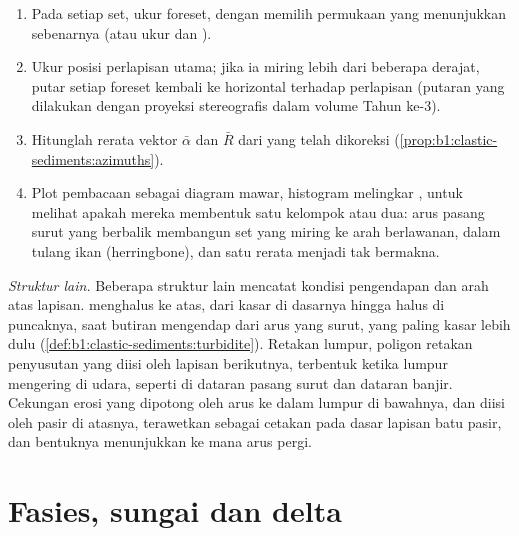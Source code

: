 \begin{method}\label{met:b1:clastic-sediments:palaeocurrent}
\begin{enumerate}
  \item Pada setiap set, ukur  foreset, dengan memilih permukaan yang menunjukkan  sebenarnya (atau ukur  dan ).
  \item Ukur posisi perlapisan utama; jika ia miring lebih dari beberapa derajat, putar setiap foreset kembali ke horizontal terhadap  perlapisan (putaran yang dilakukan dengan proyeksi stereografis dalam volume Tahun ke-3).
  \item Hitunglah rerata vektor $\bar\alpha$ dan $\bar R$ dari  yang telah dikoreksi (\cref{prop:b1:clastic-sediments:azimuths}).
  \item Plot pembacaan sebagai diagram mawar, histogram melingkar , untuk melihat apakah mereka membentuk satu kelompok atau dua: arus pasang surut yang berbalik membangun set yang miring ke arah berlawanan, dalam  tulang ikan (herringbone), dan satu rerata menjadi tak bermakna.
\end{enumerate}
\end{method}

\emph{Struktur lain.} Beberapa struktur lain mencatat kondisi pengendapan dan arah atas lapisan.  menghalus ke atas, dari kasar di dasarnya hingga halus di puncaknya, saat butiran mengendap dari arus yang surut, yang paling kasar lebih dulu (\cref{def:b1:clastic-sediments:turbidite}). Retakan lumpur, poligon retakan penyusutan yang diisi oleh lapisan berikutnya, terbentuk ketika lumpur mengering di udara, seperti di dataran pasang surut dan dataran banjir. Cekungan erosi yang dipotong oleh arus ke dalam lumpur di bawahnya, dan diisi oleh pasir di atasnya, terawetkan sebagai cetakan pada dasar lapisan batu pasir, dan bentuknya menunjukkan ke mana arus pergi.

\section{Fasies, sungai dan delta}\label{sec:b1:clastic-sediments:rivers-deltas}

